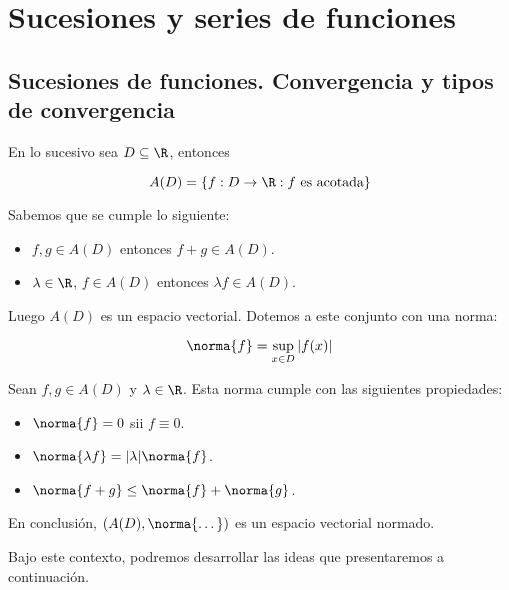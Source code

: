 \section{Sucesiones y series de funciones}

\subsection{Sucesiones de funciones. Convergencia y tipos de convergencia}

\begin{nota}
    En lo sucesivo sea $D \subseteq \R$, entonces
    
    \[
    A(D) = \{f: D \rightarrow \R : f \text{ es acotada}\}
    \]
    
    Sabemos que se cumple lo siguiente:
    
    \begin{itemize}
        \item $f,g \in A(D)$ entonces $f+g \in A(D)$.
        \item $\lambda \in \R$, $f \in A(D)$ entonces $\lambda f \in A(D)$.
    \end{itemize}
    
    Luego $A(D)$ es un espacio vectorial. Dotemos a este conjunto con una norma:
    
    \[
    \norma{f} = \sup_{x \in D} |f (x)|
    \]
    
    Sean $f,g \in A(D)$ y $\lambda \in \R$. Esta norma cumple con las siguientes propiedades:
    
    \begin{itemize}
        \item $\norma{f} = 0$ sii $f \equiv 0$.
        \item $\norma{\lambda f} = |\lambda|\norma{f}$.
        \item $\norma{f + g} \leq \norma{f} + \norma{g}$.
    \end{itemize}
    
    En conclusión, $(A(D), \norma{\dots})$ es un espacio vectorial normado.
\end{nota}

Bajo este contexto, podremos desarrollar las ideas que presentaremos a continuación.


